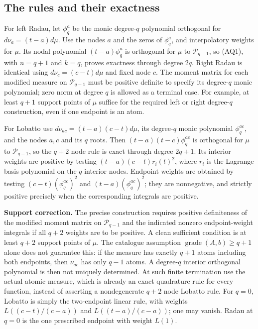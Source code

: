 \documentclass[11pt,a4paper]{article}
\theoremstyle{definition}
\begin{document}
\subsection*{The rules and their exactness}
For left Radau, let $\phi_q^a$ be the monic degree-$q$ polynomial
orthogonal for $d\nu_a=(t-a)d\mu$.  Use the nodes $a$ and the zeros of
$\phi_q^a$, and interpolatory weights for $\mu$.
Its nodal polynomial $(t-a)\phi_q^a$ is orthogonal for $\mu$ to
$\mathcal P_{q-1}$, so (AQ1), with $n=q+1$ and $k=q$, proves
exactness through degree $2q$.  Right Radau is identical using
$d\nu_c=(c-t)d\mu$ and fixed node $c$.
The moment matrix for each modified measure on $\mathcal P_{q-1}$
must be positive definite to specify its degree-$q$ monic polynomial;
zero norm at degree $q$ is allowed as a terminal case.
For example, at least $q+1$ support points of $\mu$ suffice for
the required left or right degree-$q$ construction, even if one
endpoint is an atom.

For Lobatto use
$d\nu_{ac}=(t-a)(c-t)d\mu$, its degree-$q$ monic polynomial
$\phi_q^{ac}$, and the nodes $a,c$ and its $q$ roots.
Then $(t-a)(t-c)\phi_q^{ac}$ is orthogonal for $\mu$ to
$\mathcal P_{q-1}$, so the $q+2$ node rule is exact through degree
$2q+1$.  Its interior weights are positive by testing
$(t-a)(c-t)r_i(t)^2$, where $r_i$ is the Lagrange basis polynomial
on the $q$ interior nodes.  Endpoint weights are obtained by testing
$(c-t)(\phi_q^{ac})^2$ and $(t-a)(\phi_q^{ac})^2$; they are
nonnegative, and strictly positive precisely when the corresponding
integrals are positive.

\textbf{Support correction.}  The precise construction requires positive
definiteness of the modified moment matrix on $\mathcal P_{q-1}$
and the indicated nonzero endpoint-weight integrals if all $q+2$
weights are to be positive.  A clean sufficient condition is at least
$q+2$ support points of $\mu$.  The catalogue assumption
$\operatorname{grade}(A,b)\ge q+1$ alone does not guarantee this:
if the measure has exactly $q+1$ atoms including both endpoints,
then $\nu_{ac}$ has only $q-1$ atoms.  A degree-$q$ interior
orthogonal polynomial is then not uniquely determined.
At such finite termination use the actual atomic measure, which is
already an exact quadrature rule for every function, instead of
asserting a nondegenerate $q+2$ node Lobatto rule.
For $q=0$, Lobatto is simply the two-endpoint linear rule,
with weights $L((c-t)/(c-a))$ and $L((t-a)/(c-a))$;
one may vanish.  Radau at $q=0$ is the one prescribed endpoint
with weight $L(1)$.
\end{document}
